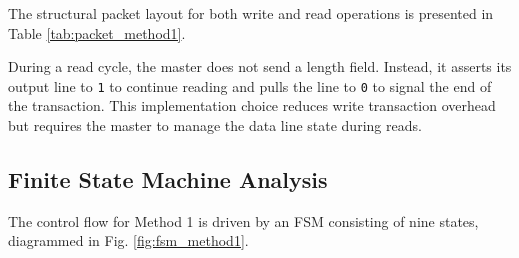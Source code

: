 \documentclass[conference]{IEEEtran}
\begin{document}
The structural packet layout for both write and read operations is presented in Table \ref{tab:packet_method1}.

\begin{table}[htbp]
\caption{Method 1 Packet Formats}
\label{tab:packet_method1}
\centering
{}
\end{table}

During a read cycle, the master does not send a length field. Instead, it asserts its output line to \texttt{1} to continue reading and pulls the line to \texttt{0} to signal the end of the transaction. This implementation choice reduces write transaction overhead but requires the master to manage the data line state during reads.

\subsection{Finite State Machine Analysis}
The control flow for Method 1 is driven by an FSM consisting of nine states, diagrammed in Fig. \ref{fig:fsm_method1}.
\end{document}
